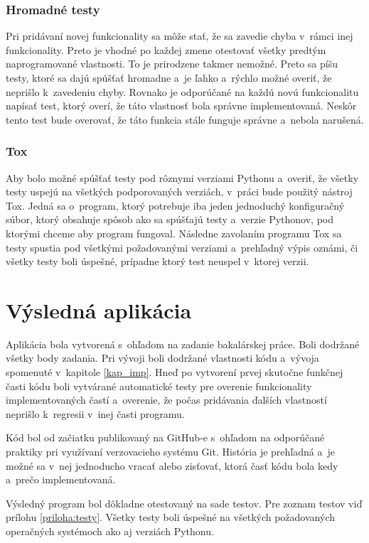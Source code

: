 \subsection{Hromadné testy}
Pri pridávaní novej funkcionality sa môže stať, že sa zavedie chyba v~rámci inej
funkcionality. Preto je vhodné po každej zmene otestovať všetky predtým
naprogramované vlastnosti. To je prirodzene takmer nemožné. Preto sa píšu testy,
ktoré sa dajú spúšťať hromadne a~je ľahko a~rýchlo možné overiť, že neprišlo
k~zavedeniu chyby. Rovnako je odporúčané na každú novú funkcionalitu napísať test, ktorý overí, že táto vlastnosť bola správne implementovaná. Neskôr tento test bude overovať, že táto funkcia stále funguje správne a~nebola narušená.

\subsection{Tox}
\label{sec_tox}
Aby bolo možné spúšťať testy pod rôznymi verziami Pythonu a~overiť, že všetky testy
uspejú na všetkých podporovaných verziách, v~práci bude použitý nástroj Tox.
Jedná sa o~program, ktorý potrebuje iba jeden jednoduchý konfiguračný súbor, ktorý
obsahuje spôsob ako sa spúšťajú testy a~verzie Pythonov, pod ktorými chceme
aby program fungoval. Následne zavolaním programu Tox sa testy
spustia pod všetkými požadovanými verziami a~prehľadný výpis oznámi, či všetky
testy boli úspešné, prípadne ktorý test neuspel v~ktorej verzii.


\chapter{Výsledná aplikácia}
Aplikácia bola vytvorená s~ohľadom na zadanie bakalárskej práce. Boli dodržané všetky body zadania. Pri vývoji boli dodržané vlastnosti kódu a~vývoja spomenuté v~kapitole \ref{kap_imp}. Hneď po vytvorení prvej skutočne funkčnej časti kódu boli vytvárané automatické testy pre overenie  funkcionality implementovaných častí a~overenie, že počas pridávania ďalších vlastností neprišlo k~regresii v~inej časti programu. 

Kód bol od začiatku publikovaný na GitHub-e s~ohľadom na odporúčané praktiky pri využívaní verzovacieho systému Git. História je prehľadná a~je možné sa v~nej jednoducho vracať alebo zisťovať, ktorá časť kódu bola kedy a~prečo implementovaná.

Výsledný program bol dôkladne otestovaný na sade testov. Pre zoznam testov viď prílohu \ref{priloha:testy}. Všetky testy boli úspešné na všetkých požadovaných operačných systémoch ako aj verziách Pythonu.

